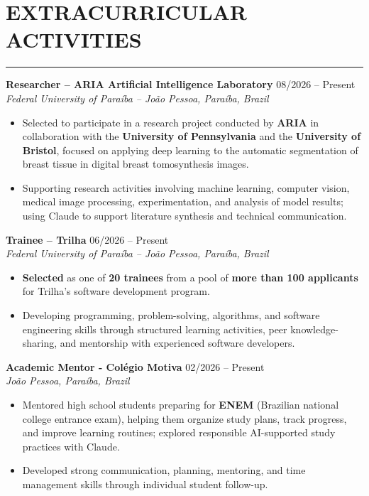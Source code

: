 \documentclass[10pt,a4paper]{article}
\begin{document}
\section*{EXTRACURRICULAR ACTIVITIES}
\vspace{-2.5mm}
\hrule
\vspace{1.2mm}

\textbf{Researcher -- ARIA Artificial Intelligence Laboratory}
\hfill 08/2026 -- Present \\
\textit{Federal University of Paraíba -- João Pessoa, Paraíba, Brazil}

\begin{itemize}[leftmargin=*,itemsep=-2pt,topsep=1pt]
    \item Selected to participate in a research project conducted by \textbf{ARIA} in collaboration with the \textbf{University of Pennsylvania} and the \textbf{University of Bristol}, focused on applying deep learning to the automatic segmentation of breast tissue in digital breast tomosynthesis images.

    \item Supporting research activities involving machine learning, computer vision, medical image processing, experimentation, and analysis of model results; using Claude to support literature synthesis and technical communication.
\end{itemize}

\noindent
\textbf{Trainee -- Trilha}
\hfill 06/2026 -- Present \\
\textit{Federal University of Paraíba -- João Pessoa, Paraíba, Brazil}

\begin{itemize}[leftmargin=*,itemsep=-2pt,topsep=1pt]
    \item \textbf{Selected} as one of \textbf{20 trainees} from a pool of \textbf{more than 100 applicants} for Trilha's software development program.

    \item Developing programming, problem-solving, algorithms, and software engineering skills through structured learning activities, peer knowledge-sharing, and mentorship with experienced software developers.
\end{itemize}

\vspace{1mm}
\noindent
\textbf{Academic Mentor - Colégio Motiva} \hfill 02/2026 -- Present \\
\textit{João Pessoa, Paraíba, Brazil}
\begin{itemize}[leftmargin=*,itemsep=-2pt, topsep=1pt]
    \item Mentored high school students preparing for \textbf{ENEM} (Brazilian national college entrance exam), helping them organize study plans, track progress, and improve learning routines; explored responsible AI-supported study practices with Claude.
    \item Developed strong communication, planning, mentoring, and time management skills through individual student follow-up.
\end{itemize}
\end{document}
